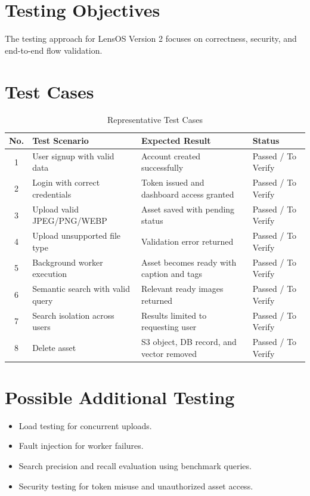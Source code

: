 \documentclass[12pt,a4paper]{report}
\begin{document}
\section{Testing Objectives}
The testing approach for LensOS Version 2 focuses on correctness, security, and end-to-end flow validation.

\section{Test Cases}
\begin{table}[H]
\centering
\caption{Representative Test Cases}
\begin{tabularx}{\textwidth}{|c|X|X|X|}
\hline
\textbf{No.} & \textbf{Test Scenario} & \textbf{Expected Result} & \textbf{Status} \\
\hline
1 & User signup with valid data & Account created successfully & Passed / To Verify \\
\hline
2 & Login with correct credentials & Token issued and dashboard access granted & Passed / To Verify \\
\hline
3 & Upload valid JPEG/PNG/WEBP & Asset saved with pending status & Passed / To Verify \\
\hline
4 & Upload unsupported file type & Validation error returned & Passed / To Verify \\
\hline
5 & Background worker execution & Asset becomes ready with caption and tags & Passed / To Verify \\
\hline
6 & Semantic search with valid query & Relevant ready images returned & Passed / To Verify \\
\hline
7 & Search isolation across users & Results limited to requesting user & Passed / To Verify \\
\hline
8 & Delete asset & S3 object, DB record, and vector removed & Passed / To Verify \\
\hline
\end{tabularx}
\end{table}

\section{Possible Additional Testing}
\begin{itemize}[leftmargin=*]
    \item Load testing for concurrent uploads.
    \item Fault injection for worker failures.
    \item Search precision and recall evaluation using benchmark queries.
    \item Security testing for token misuse and unauthorized asset access.
\end{itemize}
\end{document}
